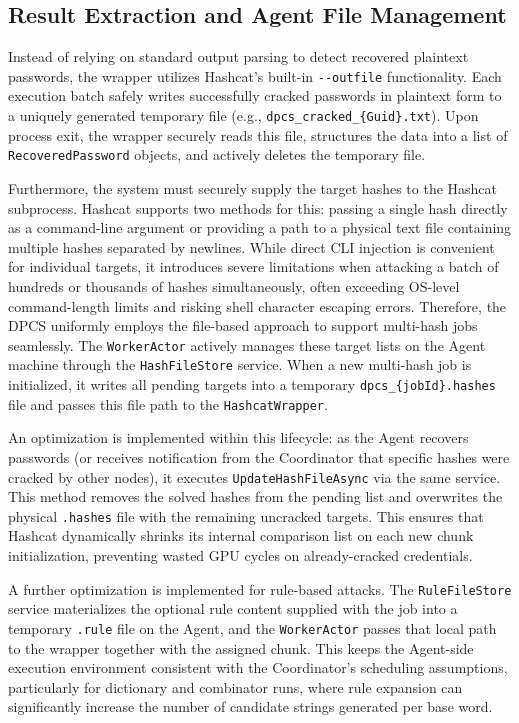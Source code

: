 \subsection{Result Extraction and Agent File Management}
\label{sec:result_extraction}
Instead of relying on standard output parsing to detect recovered plaintext passwords, the wrapper utilizes Hashcat's built-in \verb|--outfile| functionality. Each execution batch safely writes successfully cracked passwords in plaintext form to a uniquely generated temporary file (e.g., \verb|dpcs_cracked_{Guid}.txt|). Upon process exit, the wrapper securely reads this file, structures the data into a list of \verb|RecoveredPassword| objects, and actively deletes the temporary file.

Furthermore, the system must securely supply the target hashes to the Hashcat subprocess. Hashcat supports two methods for this: passing a single hash directly as a command-line argument or providing a path to a physical text file containing multiple hashes separated by newlines. While direct CLI injection is convenient for individual targets, it introduces severe limitations when attacking a batch of hundreds or thousands of hashes simultaneously, often exceeding OS-level command-length limits and risking shell character escaping errors. Therefore, the DPCS uniformly employs the file-based approach to support multi-hash jobs seamlessly. The \verb|WorkerActor| actively manages these target lists on the Agent machine through the \verb|HashFileStore| service. When a new multi-hash job is initialized, it writes all pending targets into a temporary \verb|dpcs_{jobId}.hashes| file and passes this file path to the \verb|HashcatWrapper|.

An optimization is implemented within this lifecycle: as the Agent recovers passwords (or receives notification from the Coordinator that specific hashes were cracked by other nodes), it executes \verb|UpdateHashFileAsync| via the same service. This method removes the solved hashes from the pending list and overwrites the physical \verb|.hashes| file with the remaining uncracked targets. This ensures that Hashcat dynamically shrinks its internal comparison list on each new chunk initialization, preventing wasted GPU cycles on already-cracked credentials.

A further optimization is implemented for rule-based attacks. The \verb|RuleFileStore| service materializes the optional rule content supplied with the job into a temporary \verb|.rule| file on the Agent, and the \verb|WorkerActor| passes that local path to the wrapper together with the assigned chunk. This keeps the Agent-side execution environment consistent with the Coordinator's scheduling assumptions, particularly for dictionary and combinator runs, where rule expansion can significantly increase the number of candidate strings generated per base word.


